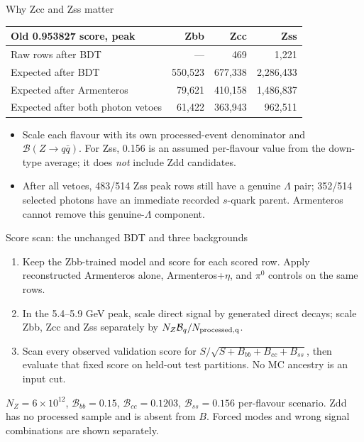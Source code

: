 \documentclass[aspectratio=169,10pt]{beamer}
\begin{document}
\begin{frame}{Why Zcc and Zss matter}
\small\begin{tabular}{lrrr}
\toprule
Old 0.953827 score, peak & Zbb & Zcc & Zss\\\midrule
Raw rows after BDT & --- & 469 & 1,221\\
Expected after BDT & 550,523 & 677,338 & 2,286,433\\
Expected after Armenteros & 79,621 & 410,158 & 1,486,837\\
Expected after both photon vetoes & 61,422 & 363,943 & 962,511\\
\bottomrule\end{tabular}
\vspace{.8em}

\begin{itemize}
\item Scale each flavour with its own processed-event denominator and $\mathcal B(Z\to q\bar q)$. For Zss, 0.156 is an assumed per-flavour value from the down-type average; it does \emph{not} include Zdd candidates.
\item After all vetoes, 483/514 Zss peak rows still have a genuine $\Lambda$ pair; 352/514 selected photons have an immediate recorded $s$-quark parent. Armenteros cannot remove this genuine-$\Lambda$ component.
\end{itemize}
\end{frame}

\begin{frame}{Score scan: the unchanged BDT and three backgrounds}
\small\begin{enumerate}
\item Keep the Zbb-trained model and score for each scored row. Apply reconstructed Armenteros alone, Armenteros+$\eta$, and $\pi^0$ controls on the same rows.
\item In the 5.4--5.9 GeV peak, scale direct signal by generated direct decays; scale Zbb, Zcc and Zss separately by $N_Z\mathcal B_q/N_{\rm processed,q}$.
\item Scan every observed validation score for $S/\sqrt{S+B_{bb}+B_{cc}+B_{ss}}$, then evaluate that fixed score on held-out test partitions. No MC ancestry is an input cut.
\end{enumerate}
\scriptsize $N_Z=6\times10^{12}$, $\mathcal B_{bb}=0.15$, $\mathcal B_{cc}=0.1203$, $\mathcal B_{ss}=0.156$ per-flavour scenario. Zdd has no processed sample and is absent from $B$. Forced modes and wrong signal combinations are shown separately.
\end{frame}
\end{document}
